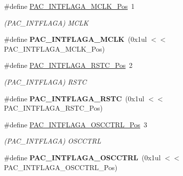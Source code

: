 \begin{DoxyCompactItemize}
\item 
\hypertarget{group___s_a_m_l21___p_a_c_ga34d71b64255f5253ff36cb01eec6435a}{}\#define \hyperlink{group___s_a_m_l21___p_a_c_ga34d71b64255f5253ff36cb01eec6435a}{P\+A\+C\+\_\+\+I\+N\+T\+F\+L\+A\+G\+A\+\_\+\+M\+C\+L\+K\+\_\+\+Pos}~1\label{group___s_a_m_l21___p_a_c_ga34d71b64255f5253ff36cb01eec6435a}

\begin{DoxyCompactList}\small\item\em (P\+A\+C\+\_\+\+I\+N\+T\+F\+L\+A\+G\+A) M\+C\+L\+K \end{DoxyCompactList}\item 
\hypertarget{group___s_a_m_l21___p_a_c_ga409dcc8db29c0081a0e594900e08c8b0}{}\#define {\bfseries P\+A\+C\+\_\+\+I\+N\+T\+F\+L\+A\+G\+A\+\_\+\+M\+C\+L\+K}~(0x1ul $<$$<$ P\+A\+C\+\_\+\+I\+N\+T\+F\+L\+A\+G\+A\+\_\+\+M\+C\+L\+K\+\_\+\+Pos)\label{group___s_a_m_l21___p_a_c_ga409dcc8db29c0081a0e594900e08c8b0}

\item 
\hypertarget{group___s_a_m_l21___p_a_c_gacea8dc7ff223aaf6ebae753d92457d3e}{}\#define \hyperlink{group___s_a_m_l21___p_a_c_gacea8dc7ff223aaf6ebae753d92457d3e}{P\+A\+C\+\_\+\+I\+N\+T\+F\+L\+A\+G\+A\+\_\+\+R\+S\+T\+C\+\_\+\+Pos}~2\label{group___s_a_m_l21___p_a_c_gacea8dc7ff223aaf6ebae753d92457d3e}

\begin{DoxyCompactList}\small\item\em (P\+A\+C\+\_\+\+I\+N\+T\+F\+L\+A\+G\+A) R\+S\+T\+C \end{DoxyCompactList}\item 
\hypertarget{group___s_a_m_l21___p_a_c_ga28922f25de87d18aef34ad75a60104af}{}\#define {\bfseries P\+A\+C\+\_\+\+I\+N\+T\+F\+L\+A\+G\+A\+\_\+\+R\+S\+T\+C}~(0x1ul $<$$<$ P\+A\+C\+\_\+\+I\+N\+T\+F\+L\+A\+G\+A\+\_\+\+R\+S\+T\+C\+\_\+\+Pos)\label{group___s_a_m_l21___p_a_c_ga28922f25de87d18aef34ad75a60104af}

\item 
\hypertarget{group___s_a_m_l21___p_a_c_gab1d2e78c048c19fa40ded1a2164911c1}{}\#define \hyperlink{group___s_a_m_l21___p_a_c_gab1d2e78c048c19fa40ded1a2164911c1}{P\+A\+C\+\_\+\+I\+N\+T\+F\+L\+A\+G\+A\+\_\+\+O\+S\+C\+C\+T\+R\+L\+\_\+\+Pos}~3\label{group___s_a_m_l21___p_a_c_gab1d2e78c048c19fa40ded1a2164911c1}

\begin{DoxyCompactList}\small\item\em (P\+A\+C\+\_\+\+I\+N\+T\+F\+L\+A\+G\+A) O\+S\+C\+C\+T\+R\+L \end{DoxyCompactList}\item 
\hypertarget{group___s_a_m_l21___p_a_c_gaffc24c4040cb6b84eb799e3dc8474854}{}\#define {\bfseries P\+A\+C\+\_\+\+I\+N\+T\+F\+L\+A\+G\+A\+\_\+\+O\+S\+C\+C\+T\+R\+L}~(0x1ul $<$$<$ P\+A\+C\+\_\+\+I\+N\+T\+F\+L\+A\+G\+A\+\_\+\+O\+S\+C\+C\+T\+R\+L\+\_\+\+Pos)\label{group___s_a_m_l21___p_a_c_gaffc24c4040cb6b84eb799e3dc8474854}


\end{DoxyCompactItemize}
